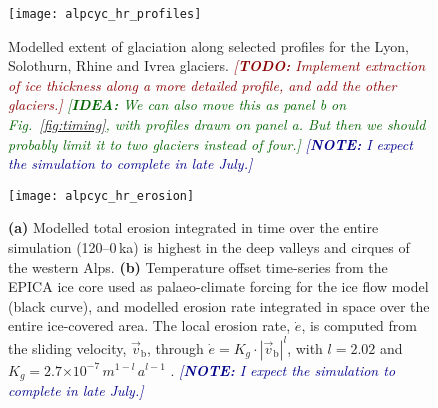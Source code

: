 \documentclass{article}
\newcommand{\idea}[1]{\textcolor{darkgreen}{\emph{[\textbf{IDEA:} #1]}}}
\newcommand{\note}[1]{\textcolor{darkblue}{\emph{[\textbf{NOTE:} #1]}}}
\newcommand{\todo}[1]{\textcolor{darkred}{\emph{[\textbf{TODO:} #1]}}}
\newcommand{\e}[1]{\ensuremath{\times 10^{#1}}}
\begin{document}
    \begin{figure}
      \centerline{\texttt{[image: alpcyc\_hr\_profiles]}}
      \caption{%
        Modelled extent of glaciation along selected profiles for the Lyon,
        Solothurn, Rhine and Ivrea glaciers.
        \todo{Implement extraction of ice thickness along a more detailed
              profile, and add the other glaciers.}
        \idea{We can also move this as panel b on Fig.~\ref{fig:timing}, with
              profiles drawn on panel a. But then we should probably limit it
              to two glaciers instead of four.}
        \note{I expect the simulation to complete in late July.}}
      \label{fig:profiles}
    \end{figure}

    \begin{figure}
      \centerline{\texttt{[image: alpcyc\_hr\_erosion]}}
      \caption{%
        \textbf{(a)} Modelled total erosion integrated in time over the entire
        simulation (120--0\,ka) is highest in the deep valleys and cirques of
        the western Alps.
        \textbf{(b)} Temperature offset time-series from the EPICA ice core
        used as palaeo-climate forcing for the ice flow model (black curve),
        and modelled erosion rate integrated in space over the entire
        ice-covered area. The local erosion rate, $\dot{e}$, is computed from
        the sliding velocity, $\vec{v}_{\mathrm{b}}$, through
        $\dot{e} = K_g \cdot |\vec{v}_{\mathrm{b}}|^{l}$, with
        $l = 2.02$ and $K_g = 2.7\e{-7}\,m^{1-l}\,a^{l-1}$
        \citep{Herman.etal.2015}.
        \note{I expect the simulation to complete in late July.}}
      \label{fig:erosion}
    \end{figure}


\clearpage
\end{document}
